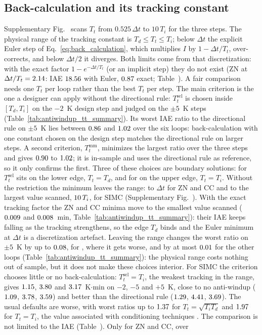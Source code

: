 \subsection{Back-calculation and its tracking constant}
\label{subsec:backcalc}
Supplementary Fig.~ scans $T_t$ from $0.525\,\Delta t$ to $10\,T_i$ for the three steps. The physical range of the tracking constant is $T_d \le T_t \le T_i$; below $\Delta t$ the explicit Euler step of Eq.~\eqref{eq:back_calculation}, which multiplies $I$ by $1 - \Delta t/T_t$, over-corrects, and below $\Delta t/2$ it diverges. Both limits come from that discretization: with the exact factor $1 - e^{-\Delta t/T_t}$ (or an implicit step) they do not exist (ZN at $\Delta t/T_t = 2.14$: IAE $18.56$ with Euler, $0.87$ exact; Table~). A fair comparison needs one $T_t$ per loop rather than the best $T_t$ per step. The main criterion is the one a designer can apply without the directional rule: $T_t^{\mathrm{sel}}$ is chosen inside $[T_d, T_i]$ on the $-2$~K design step and judged on the $\pm 5$~K steps (Table~\ref{tab:antiwindup_tt_summary}). Its worst IAE ratio to the directional rule on $\pm 5$~K lies between $0.86$ and $1.02$ over the six loops: back-calculation with one constant chosen on the design step matches the directional rule on larger steps. A second criterion, $T_t^{\mathrm{mm}}$, minimizes the largest ratio over the three steps and gives $0.90$ to $1.02$; it is in-sample and uses the directional rule as reference, so it only confirms the first. Three of these choices are boundary solutions: for \vttcvlower{} $T_t^{\mathrm{sel}}$ sits on the lower edge, $T_t = T_d$, and for \vttcvupper{} on the upper edge, $T_t = T_i$. Without the restriction the minimum leaves the range: to $\Delta t$ for ZN and CC and to the largest value scanned, $10\,T_i$, for SIMC (Supplementary Fig.~). With the exact tracking factor the ZN and CC minima move to the smallest value scanned ($0.009$ and $0.008$~min, Table~\ref{tab:antiwindup_tt_summary}): their IAE keeps falling as the tracking strengthens, so the edge $T_d$ binds and the Euler minimum at $\Delta t$ is a discretization artefact. Leaving the range changes the worst ratio on $\pm 5$~K by up to $0.08$, for \vttfreediffloop{}, where it gets worse, and by at most $0.01$ for the other loops (Table~\ref{tab:antiwindup_tt_summary}): the physical range costs nothing out of sample, but it does not make these choices interior. For SIMC the criterion chooses little or no back-calculation: $T_t^{\mathrm{sel}} = T_i$, the weakest tracking in the range, gives $1.15$, $3.80$ and $3.17$~K$\cdot$min on $-2$, $-5$ and $+5$~K, close to no anti-windup ($1.09$, $3.78$, $3.59$) and better than the directional rule ($1.29$, $4.41$, $3.69$). The usual defaults are worse, with worst ratios up to $1.37$ for $T_t = \sqrt{T_iT_d}$ and $1.97$ for $T_t = T_i$, the value associated with conditioning techniques \cite{peng1996nonlinear}. The comparison is not limited to the IAE (Table~). Only for ZN and CC, over 